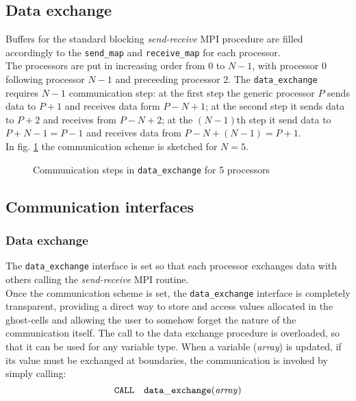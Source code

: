 \subsection{Data exchange}
%
Buffers for the standard blocking {\em send-receive} MPI procedure are filled 
accordingly to the {\tt send\_map} and {\tt receive\_map} for each processor.\\
The processors are put in increasing order from 0 to $N-1$, with processor
0 following processor $N-1$ and preceeding processor 2. 
The {\tt data\_exchange} requires $N-1$ communication step: at the first step the generic 
processor $P$ sends data to $P+1$ and receives data form $P-N+1$;
at the second step it sends data to $P+2$ and receives from $P-N+2$; 
at the $(N-1)$th step it send data to $P+N-1=P-1$ and receives data from $P-N+(N-1)=P+1$.\\ 
In fig. \ref{fig:data-exchange} the communication scheme is sketched for $N=5$.\\
\begin{figure}[h]
\centerline{}
\caption{\label{fig:data-exchange} Communication steps in {\tt data\_exchange} for 5 processors}
\end{figure}
\par
%
\subsection{Communication interfaces}
%
\subsubsection{Data exchange}
%
The {\tt data\_exchange} interface is set so that each processor exchanges
data with others calling the {\em send-receive} MPI routine.\\ 
Once the communication scheme is set, the {\tt data\_exchange} interface 
is completely transparent, providing a direct way to store and access values 
allocated in the ghost-cells and allowing the user to somehow forget the 
nature of the communication itself. 
The call to the data exchange procedure is overloaded, so that it can be used
for any variable type.  When a variable ({\em array}) is
 updated, if its value must be exchanged at boundaries, the communication is invoked by
simply calling:
\begin{displaymath}
\tt CALL \quad data\_exchange({\it array})
\end{displaymath}
\clearpage%
